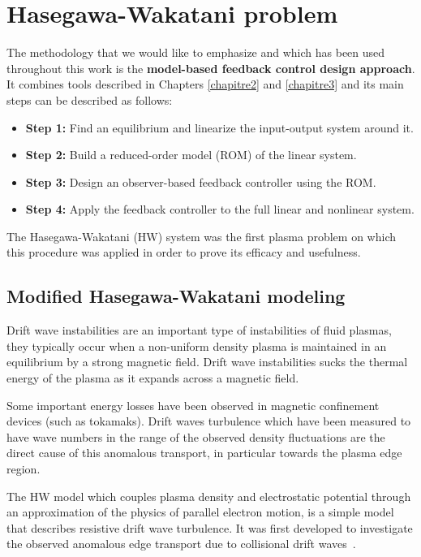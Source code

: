 \documentclass[12pt,lot, lof]{puthesis}
\begin{document}
\chapter{Hasegawa-Wakatani problem}

The methodology that we would like to emphasize and which has been used throughout this work is the \textbf{model-based feedback control design approach}. It combines tools described in Chapters \ref{chapitre2} and \ref{chapitre3} and its main steps can be described as follows: \\
%
\begin{itemize}
\item \textbf{Step 1:}  Find an equilibrium and linearize the input-output system around it.
\item \textbf{Step 2:}  Build a reduced-order model (ROM) of the linear system.
\item \textbf{Step 3:}  Design an observer-based feedback controller using the ROM.
\item \textbf{Step 4:}  Apply the feedback controller to the full linear and nonlinear system.\\
\end{itemize}
%
The Hasegawa-Wakatani \cite{Hasegawa1,Hasegawa2}  (HW) system was the first plasma problem on which this procedure was applied in order to prove its efficacy and usefulness.

\section{Modified Hasegawa-Wakatani modeling}

Drift wave instabilities are an important type of instabilities of fluid plasmas, they typically occur when a non-uniform density plasma is maintained in an equilibrium by a strong magnetic field. Drift wave instabilities sucks the thermal energy of the plasma as it expands across a magnetic field.

Some important energy losses have been observed in magnetic confinement devices (such as tokamaks). Drift waves turbulence which have been measured to have wave numbers in the range of the observed density fluctuations are the direct cause of this anomalous transport, in particular towards the plasma edge region.

The HW model which couples plasma density and electrostatic potential through an approximation of the physics of parallel electron motion, is a simple model that describes resistive drift wave turbulence. It was first developed to investigate the observed anomalous edge transport due to collisional drift waves~\cite{Horton}.
\end{document}

